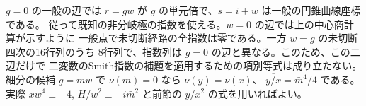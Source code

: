 $g=0$ の一般の辺では $r=gw$ が $g$ の単元倍で、$s=i+w$ は一般の円錐曲線座標である。
従って既知の非分岐極の指数を使える。$w=0$ の辺では上の中心商計算が示すように
一般点で未切断経路の全指数は零である。一方 $w=g$ の未切断四次の16行列のうち
8行列で、指数列は $g=0$ の辺と異なる。このため、この二辺だけで
二変数のSmith指数の補題を適用するための項別等式は成り立たない。
細分の候補 $g=mw$ で $\nu(m)=0$ なら $\nu(y)=\nu(x)$、
$\overline{y/x}=\bar m^4/4$ である。実際 $xw^4\equiv-4$,
$H/w^2\equiv-i\bar m^2$ と前節の $y/x^2$ の式を用いればよい。
